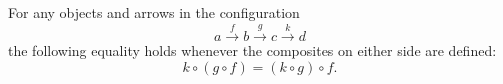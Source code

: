 For any objects and arrows in the configuration
$$a \xrightarrow{f} b \xrightarrow{g} c \xrightarrow{k} d$$
the following equality holds whenever the composites on either side are defined:
$$k \circ (g \circ f) = (k \circ g) \circ f.$$
